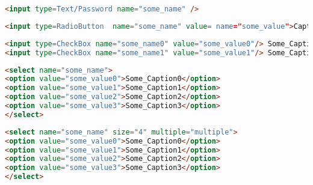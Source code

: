 \begin{lstlisting}[language=HTML,label=code:HTMLTxt,caption=HTML tag for \code{Text}/\code{Password}]
<input type=Text/Password name="some_name" />
\end{lstlisting}

\begin{lstlisting}[language=HTML,label=code:HTMLradi,caption=HTML tag for \code{RadioButton}]
<input type=RadioButton  name="some_name" value= name="some_value">Caption
\end{lstlisting}


\begin{lstlisting}[language=HTML,label=code:HTMLcheck,caption=HTML tag for \code{RadioButton}]
<input type=CheckBox name="some_name0" value="some_value0"/> Some_Caption0
<input type=CheckBox name="some_name1" value="some_value1"/> Some_Caption1
\end{lstlisting}

\begin{lstlisting}[language=HTML,label=code:HTMLdrop,caption=HTML tag for \code{DropDown}]
<select name="some_name">
<option value="some_value0">Some_Caption0</option>
<option value="some_value1">Some_Caption1</option>
<option value="some_value2">Some_Caption2</option>
<option value="some_value3">Some_Caption3</option>
</select>
\end{lstlisting}


\begin{lstlisting}[language=HTML,label=code:HTMLmulSel,caption=HTML tag for \code{MultipleSelect}]
<select name="some_name" size="4" multiple="multiple">
<option value="some_value0">Some_Caption0</option>
<option value="some_value1">Some_Caption1</option>
<option value="some_value2">Some_Caption2</option>
<option value="some_value3">Some_Caption3</option>
</select>
\end{lstlisting}